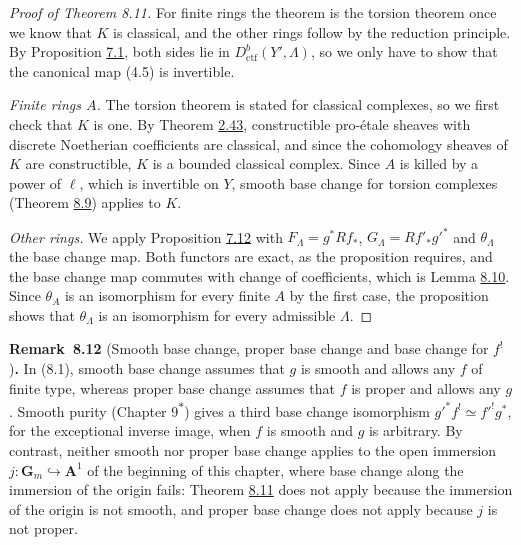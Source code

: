 \documentclass[11pt]{article}
\newenvironment{bpstatement}[2]{\par\addvspace{0.6\baselineskip}\noindent\textbf{#1}#2\textbf{.}\enspace\ignorespaces}
  {\par\addvspace{0.4\baselineskip}}
\newcommand{\bpout}[1]{#1\textsuperscript{\hyperlink{bp-outside}{\ensuremath{\ast}}}}
\begin{document}
\begin{proof}[{Proof of Theorem 8.11}]\label{bp683}%
For finite rings the theorem is the torsion theorem once we know that \(K\) is classical, and the other rings follow by the reduction principle. By Proposition \hyperref[bp605]{7.1}, both sides lie in \(D^b_{\mathrm{ctf}}(Y',\Lambda)\), so we only have to show that the canonical map (4.5) is invertible.

\emph{Finite rings \(A\).} The torsion theorem is stated for classical complexes, so we first check that \(K\) is one. By Theorem \hyperref[bp129]{2.43}, constructible pro-étale sheaves with discrete Noetherian coefficients are classical, and since the cohomology sheaves of \(K\) are constructible, \(K\) is a bounded classical complex. Since \(A\) is killed by a power of \(\ell\), which is invertible on \(Y\), smooth base change for torsion complexes (Theorem \hyperref[bp674]{8.9}) applies to \(K\).

\emph{Other rings.} We apply Proposition \hyperref[bp634]{7.12} with \(F_\Lambda=g^*Rf_*\), \(G_\Lambda=Rf'_*g'^*\) and \(\theta_\Lambda\) the base change map. Both functors are exact, as the proposition requires, and the base change map commutes with change of coefficients, which is Lemma \hyperref[bp679]{8.10}. Since \(\theta_A\) is an isomorphism for every finite \(A\) by the first case, the proposition shows that \(\theta_\Lambda\) is an isomorphism for every admissible \(\Lambda\).
\end{proof}

\label{bp684}%
\begin{bpstatement}{Remark~8.12}{ (Smooth base change, proper base change and base change for $f^!$)}
In (8.1), smooth base change assumes that \(g\) is smooth and allows any \(f\) of finite type, whereas proper base change assumes that \(f\) is proper and allows any \(g\). Smooth purity (Chapter \bpout{9}) gives a third base change isomorphism \(g'^*f^!\simeq f'^!g^*\), for the exceptional inverse image, when \(f\) is smooth and \(g\) is arbitrary. By contrast, neither smooth nor proper base change applies to the open immersion \(j:\mathbf G_m\hookrightarrow\mathbf A^1\) of the beginning of this chapter, where base change along the immersion of the origin fails: Theorem \hyperref[bp681]{8.11} does not apply because the immersion of the origin is not smooth, and proper base change does not apply because \(j\) is not proper.
\end{bpstatement}
\end{document}
